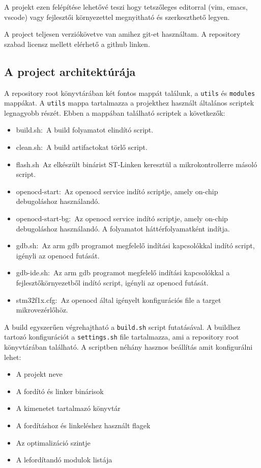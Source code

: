 A projekt ezen felépítése lehetővé teszi hogy tetszőleges editorral (vim, emacs,
vscode) vagy fejlesztői környezettel megnyitható és szerkeszthető legyen.

A project teljesen verziókövetve van amihez git-et használtam. A repository
szabad licensz mellett elérhető a github linken\cite{RpirobotGitrepo}. 

\subsection{A project architektúrája}

A repository root könyvtárában két fontos mappát találunk, a \verb|utils| és
\verb|modules| mappákat. A \verb|utils| mappa tartalmazza a projekthez használt
általános scriptek legnagyobb részét. Ebben a mappában található scriptek a
következők:

\begin{itemize}
\item{build.sh:~A build folyamatot elindító script.}
\item{clean.sh:~A build artifactokat törlő script.}
\item{flash.sh~Az elkészült binárist ST-Linken keresztül a mikrokontrollerre
  másoló script.}
\item{openocd-start:~Az openocd service indító scriptje, amely on-chip
  debugoláshoz használandó.}
\item{openocd-start-bg:~Az openocd service indító scriptje, amely on-chip
  debugoláshoz használandó. A folyamatot háttérfolyamatként indítja.}
\item{gdb.sh:~Az arm gdb programot megfelelő indítási kapcsolókkal indító script,
  igényli az openocd futását.}
\item{gdb-ide.sh:~Az arm gdb programot megfelelő indítási kapcsolókkal a
  fejlesztőkörnyezetből indító script, igényli az openocd futását.}
\item{stm32f1x.cfg:~Az openocd által igényelt konfigurációs file a target
  mikrovezérlőhöz.}
\end{itemize}

A build egyszerűen végrehajtható a \verb|build.sh| script futatásával. A buildhez
tartozó konfigurációt a \verb|settings.sh| file tartalmazza, ami a repository
root könyvtárában található. A scriptben néhány hasznos beállítás amit
konfigurálni lehet:

\begin{itemize}
\item{A projekt neve}
\item{A fordító és linker binárisok}
\item{A kimenetet tartalmazó könyvtár}
\item{A fordításhoz és linkeléshez használt flagek}
\item{Az optimalizáció szintje}
\item{A lefordítandó modulok listája}
\end{itemize}

